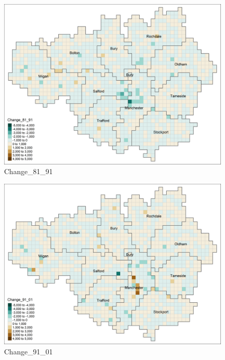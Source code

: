 \documentclass[
]{article}
\begin{document}
\begin{figure}
\centering
\includegraphics{Change_81_91.png}
\caption{Change\_81\_91}
\end{figure}

\begin{figure}
\centering
\includegraphics{Change_91_01.png}
\caption{Change\_91\_01}
\end{figure}
\end{document}
